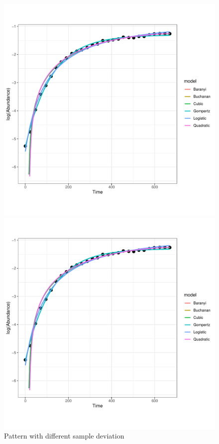 \documentclass[11pt, oneside]{article}
\begin{document}
		\begin{figure}[H]
			\begin{center}
			\begin{minipage}{.5\textwidth}
				\centering
				\includegraphics[page=89, scale = 0.5]{plot_subsets.pdf}
			\end{minipage}%
			\begin{minipage}{.5\textwidth}
				\centering
				\includegraphics[page=65, scale = 0.5]{plot_subsets.pdf}
			\end{minipage}
			\end{center}
		\caption{Pattern with different sample deviation}
		\end{figure}
		
\end{document}

